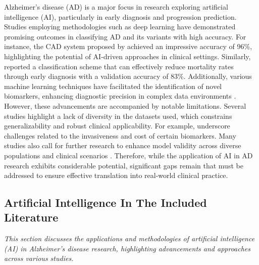 \documentclass{MITcsail}
\begin{document}
Alzheimer's disease (AD) is a major focus in research exploring artificial intelligence (AI), particularly in early diagnosis and progression prediction. Studies employing methodologies such as deep learning have demonstrated promising outcomes in classifying AD and its variants with high accuracy. For instance, the CAD system proposed by \citet{ref_10_3389_fpubh_2022_834032} achieved an impressive accuracy of 96\%, highlighting the potential of AI-driven approaches in clinical settings. Similarly, \citet{ref_10_3389_fpubh_2022_853294} reported a classification scheme that can effectively reduce mortality rates through early diagnosis with a validation accuracy of 83\%. Additionally, various machine learning techniques have facilitated the identification of novel biomarkers, enhancing diagnostic precision in complex data environments \citep{ref_10_1002_alz_13390}. However, these advancements are accompanied by notable limitations. Several studies highlight a lack of diversity in the datasets used, which constrains generalizability and robust clinical applicability. For example, \citet{ref_10_1002_alz_13390} underscore challenges related to the invasiveness and cost of certain biomarkers. Many studies also call for further research to enhance model validity across diverse populations and clinical scenarios \citep{ref_10_1016_j_neuroimage_2020_117203,ref_10_1016_s2589_7500_22_00169_8}. Therefore, while the application of AI in AD research exhibits considerable potential, significant gaps remain that must be addressed to ensure effective translation into real-world clinical practice.

\subsection{Artificial Intelligence In The Included Literature}

\textit{This section discusses the applications and methodologies of artificial intelligence (AI) in Alzheimer's disease research, highlighting advancements and approaches across various studies.}
\end{document}
